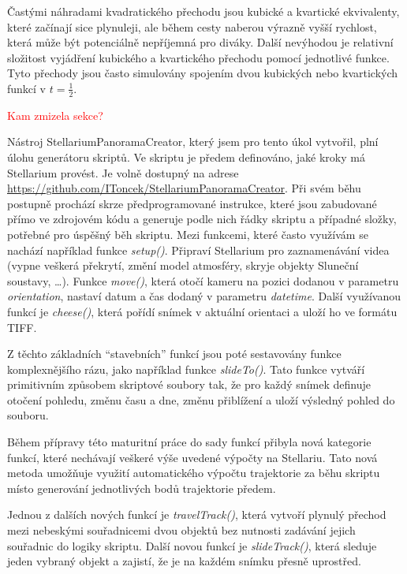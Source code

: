 \documentclass[12pt,a4paper,titlepage]{article}
\begin{document}
Častými náhradami kvadratického přechodu jsou kubické a kvartické ekvivalenty, které začínají sice plynuleji, ale během cesty naberou výrazně vyšší rychlost, která může být potenciálně nepříjemná pro diváky. Další nevýhodou je relativní složitost vyjádření kubického a kvartického přechodu pomocí jednotlivé funkce. Tyto přechody jsou často simulovány spojením dvou kubických nebo kvartických funkcí v $t=\frac{1}{2}$.

\textcolor{red}{Kam zmizela sekce?}

Nástroj StellariumPanoramaCreator, který jsem pro tento úkol vytvořil, plní úlohu generátoru skriptů. Ve skriptu je předem definováno, jaké kroky má Stellarium provést. Je volně dostupný na adrese \url{https://github.com/IToncek/StellariumPanoramaCreator}. Při svém běhu postupně prochází skrze předprogramované instrukce, které jsou zabudované přímo ve zdrojovém kódu a generuje podle nich řádky skriptu a případné složky, potřebné pro úspěšný běh skriptu. Mezi funkcemi, které často využívám se nachází například funkce \textit{setup()}. Připraví Stellarium pro zaznamenávání videa (vypne veškerá překrytí, změní model atmosféry, skryje objekty Sluneční soustavy, \ldots). Funkce \textit{move()}, která otočí kameru na pozici dodanou v parametru \textit{orientation}, nastaví datum a čas dodaný v parametru \textit{datetime}. Další využívanou funkcí je \textit{cheese()}, která pořídí snímek v aktuální orientaci a uloží ho ve formátu TIFF.%

Z těchto základních \enquote{stavebních} funkcí jsou poté sestavovány funkce komplexnějšího rázu, jako například funkce \textit{slideTo()}. Tato funkce vytváří primitivním způsobem skriptové soubory tak, že pro každý snímek definuje otočení pohledu, změnu času a dne, změnu přiblížení a uloží výsledný pohled do souboru. %

Během přípravy této maturitní práce do sady funkcí přibyla nová kategorie funkcí, které nechávají veškeré výše uvedené výpočty na Stellariu. Tato nová metoda umožňuje využití automatického výpočtu trajektorie za běhu skriptu místo generování jednotlivých bodů trajektorie předem. 

Jednou z dalších nových funkcí je \textit{travelTrack()}, která vytvoří plynulý přechod mezi nebeskými souřadnicemi dvou objektů bez nutnosti zadávání jejich souřadnic do logiky skriptu. Další novou funkcí je \textit{slideTrack()}, která sleduje jeden vybraný objekt a zajistí, že je na každém snímku přesně uprostřed. %
\end{document}
